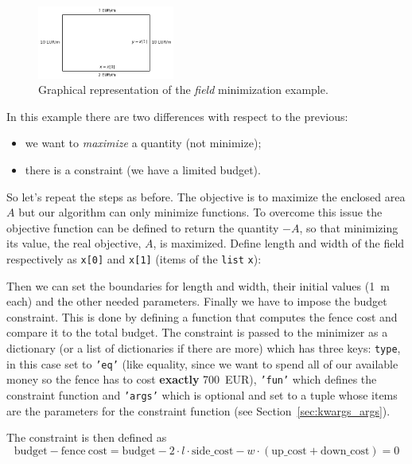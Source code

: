 \begin{figure}[ht]
\centering
\includegraphics[width=0.4\textwidth]{figures/field.png}
\caption{Graphical representation of the \emph{field} minimization example.}
\label{fig:field}
\end{figure}

In this example there are two differences with respect to the previous:

\begin{itemize}
\tightlist
\item we want to \emph{maximize} a quantity (not minimize);
\item there is a constraint (we have a limited budget).
\end{itemize}


So let's repeat the steps as before. The objective is to maximize the enclosed area $A$ but our algorithm can only minimize functions. To overcome this issue 
the objective function can be defined to return the quantity $-A$, so that minimizing its value, the real objective, $A$, is maximized. 
Define length and width of the field respectively as \texttt{x[0]} and \texttt{x[1]} (items of the \texttt{list} \texttt{x}):

Then we can set the boundaries for length and width, their initial values (1~m each) and the other needed parameters.
Finally we have to impose the budget constraint. This is done by defining a function that computes the fence cost and compare it to the total budget. 
The constraint is passed to the minimizer as a dictionary (or a list  of dictionaries if there are more) which has three keys: \texttt{type}, in this case 
set to \texttt{'eq'} (like equality, since we want to spend all of our available money so the fence has to cost \textbf{exactly} 700~EUR), \texttt{'fun'} 
which defines the constraint function and \texttt{'args'} which is optional and set to a tuple whose items are the parameters for the constraint function 
(see Section~\ref{sec:kwargs_args}).

The constraint is then defined as
\begin{equation*}
\mathrm{budget} - \mathrm{fence~cost} = \mathrm{budget} - 2\cdot l\cdot\mathrm{side\_cost} - w\cdot(\mathrm{up\_cost} + \mathrm{down\_cost}) = 0
\end{equation*}

